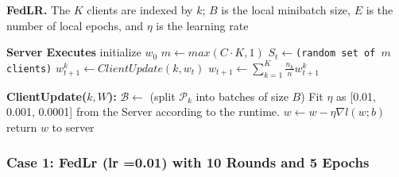 \documentclass[conference]{IEEEtran}
\begin{document}
 \begin{algorithm}[H]
 	\scriptsize
 	\caption{ \textbf{FedLR.} The $K$ clients are
 		indexed by $k$; $B$ is the local minibatch size, $E$ is the number
 		of local epochs, and $\eta$ is the learning rate}\label{alg:cap}
 	\begin{algorithmic}[1]
 		
 		\State \textbf{Server Executes}
 		\State initialize $w_0$
 		\State \texttt{$m \gets max(C\cdot K,1)$}
 		\State \texttt{$S_t \gets $(random set of $m$ clients)}
 		\State $w_{t+1}^{k} \gets ClientUpdate(k,w_t)$
 		\EndFor
 		\State $w_{t+1} \gets \sum_{k=1}^{K} \frac{n_k}{n} w_{t+1}^{k}$
 		
 		\EndFor
 		\State \textbf{ClientUpdate($k,W$):} 
 		\State $\mathcal{B} \gets$ (split $\mathcal{P}_k$ into batches of size $B$)
 		\State Fit $\eta$ as [0.01, 0.001, 0.0001] from the Server according to the runtime.
 		\State $w \gets w - \eta \nabla l(w;b)$
 		\EndFor
 		\EndFor
 		\State return $w$ to server
 		
 	\end{algorithmic}
 \end{algorithm}
 
 \subsubsection{Case 1: FedLr (lr =0.01) with 10 Rounds and 5 Epochs}
 
\end{document}
